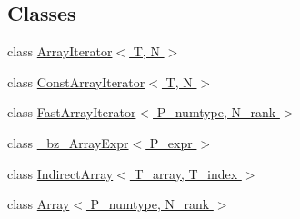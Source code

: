 \subsection*{Classes}
\begin{DoxyCompactItemize}
\item 
class \hyperlink{classArrayIterator}{Array\+Iterator$<$ T, N $>$}
\item 
class \hyperlink{classConstArrayIterator}{Const\+Array\+Iterator$<$ T, N $>$}
\item 
class \hyperlink{classFastArrayIterator}{Fast\+Array\+Iterator$<$ P\+\_\+numtype, N\+\_\+rank $>$}
\item 
class \hyperlink{class__bz__ArrayExpr}{\+\_\+bz\+\_\+\+Array\+Expr$<$ P\+\_\+expr $>$}
\item 
class \hyperlink{classIndirectArray}{Indirect\+Array$<$ T\+\_\+array, T\+\_\+index $>$}
\item 
class \hyperlink{classArray}{Array$<$ P\+\_\+numtype, N\+\_\+rank $>$}
\end{DoxyCompactItemize}

